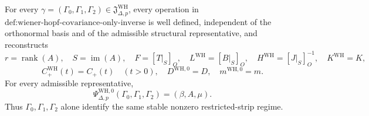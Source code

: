 For every \(\gamma=(\Gamma_0,\Gamma_1,\Gamma_2)\in\mathfrak J_{\Delta,p}^{\mathrm{WH}}\), every operation in \(\text{def:wiener-hopf-covariance-only-inverse}\) is well defined, independent of the orthonormal basis and of the admissible structural representative, and reconstructs
\[
 r=\operatorname{rank}(A),\quad S=\operatorname{im}(A),\quad
 F=[T|_S]_O,\quad L^{\mathrm{WH}}=[B|_S]_O,\quad
 H^{\mathrm{WH}}=[J|_S]_O^{-1},\quad K^{\mathrm{WH}}=K,
\]
\[
 C_{+}^{\mathrm{WH}}(t)=C_{+}(t)\quad(t>0),\quad
 D^{\mathrm{WH},0}=D,\quad
 m^{\mathrm{WH},0}=m.
\]
For every admissible representative,
\[
 \Psi_{\Delta,p}^{\mathrm{WH},0}(\Gamma_0,\Gamma_1,\Gamma_2)
 =(\beta,A,\mu).
\]
Thus \(\Gamma_0,\Gamma_1,\Gamma_2\) alone identify the same stable nonzero restricted-strip regime.